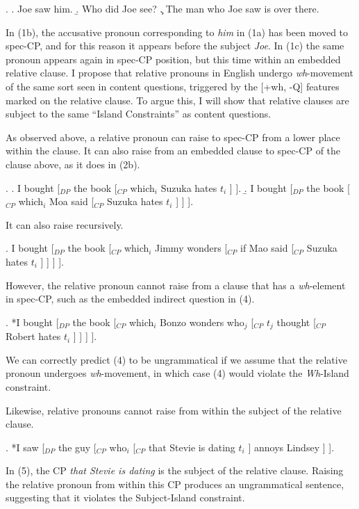 \documentclass[a4paper, 11pt]{article}
\begin{document}
\begin{enumerate}[label=\textbf{\arabic*.}]
\ex.
    \a. Joe saw him.
    \b. Who did Joe see?
    \c. The man who Joe saw is over there.

In (1b), the accusative pronoun corresponding to \emph{him} in (1a) has been moved to spec-CP,
and for this reason it appears before the subject \emph{Joe}. In (1c) the same pronoun appears
again in spec-CP position, but this time within an embedded relative clause.
I propose that relative pronouns in English undergo \emph{wh}-movement of the same sort seen
in content questions, triggered by the [+wh, -Q] features marked on the relative clause. To argue
this, I will show that relative clauses are subject to the same ``Island Constraints'' as content
questions.

As observed above, a relative pronoun can raise to spec-CP from a lower place within the clause.
It can also raise from an embedded clause to spec-CP of the clause above, as it does in (2b).

\ex.
    \a. I bought [$_{DP}$ the book 
        [$_{CP}$ which$_{i}$ Suzuka hates $t_{i}$  ] 
    ].
    \b. I bought [$_{DP}$ the book 
        [$_{CP}$ which$_{i}$ Moa said
            [$_{CP}$ Suzuka hates $t_{i}$ ]
        ]
    ].

It can also raise recursively.

\ex. I bought [$_{DP}$ the book 
[$_{CP}$ which$_{i}$ Jimmy wonders
    [$_{CP}$ if Mao said 
        [$_{CP}$ Suzuka hates $t_{i}$ ]
    ]
]
].

However, the relative pronoun cannot raise from a clause that has a \emph{wh}-element in spec-CP,
such as the embedded indirect question in (4).

\ex. *I bought [$_{DP}$ the book 
    [$_{CP}$ which$_{i}$ Bonzo wonders who$_{j}$
        [$_{CP}$ $t_{j}$ thought 
            [$_{CP}$ Robert hates $t_{i}$ ]
        ]
    ]
].

We can correctly predict (4) to be ungrammatical if we assume that the relative pronoun undergoes
\emph{wh}-movement, in which case (4) would violate the \emph{Wh}-Island constraint.

Likewise, relative pronouns cannot raise from within the subject of the relative clause.

\ex. *I saw [$_{DP}$ the guy
    [$_{CP}$ who$_{i}$
        [$_{CP}$ that Stevie is dating $t_{i}$
            ]
        annoys Lindsey
        ]
    ].

In (5), the CP \emph{that Stevie is dating} is the subject of the relative clause. Raising the
relative pronoun from within this CP produces an ungrammatical sentence, suggesting that it
violates the Subject-Island constraint.


\end{enumerate}
\end{document}
